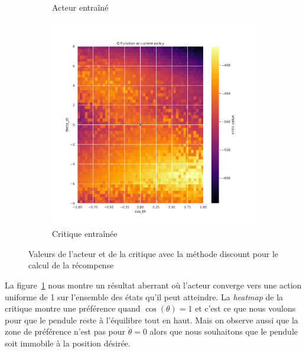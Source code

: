 \begin{figure}[H]
\begin{subfigure}{0.3\textwidth}
        \caption{Acteur entraîné}
    \end{subfigure}
    \begin{subfigure}{0.3\textwidth}
        \includegraphics[width=\textwidth]{figures/prelimaire/0_critic_discount_post_Pendulum-v0.pdf}
        \caption{Critique entraînée}
    \end{subfigure}
    \caption{Valeurs de l'acteur et de la critique avec la méthode discount pour le calcul de la récompense}
    \label{fig:preli_discount}
\end{figure}

La figure~\ref{fig:preli_discount} nous montre un résultat aberrant où l'acteur converge vers une action uniforme de 1 sur l'ensemble des états qu'il peut atteindre. La \emph{heatmap} de la critique montre une préférence quand $\cos(\theta) = 1$ et c'est ce que nous voulons pour que le pendule reste à l'équilibre tout en haut. Mais on observe aussi que la zone de préférence n'est pas pour $\dot{\theta} = 0$ alors que nous souhaitons que le pendule soit immobile à la position désirée.

